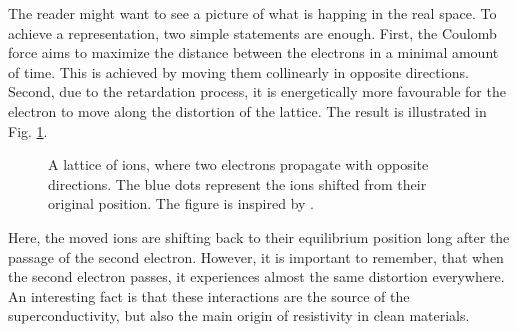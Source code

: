 \documentclass[../main.tex]{subfile}
\begin{document}
The reader might want to see a picture of what is happing in the real space. To achieve a representation, two simple statements are enough. 
First, the Coulomb force aims to maximize the distance between the electrons in a minimal amount of time.
 This is achieved by moving them collinearly in opposite directions. Second, due to the retardation process, it is energetically more favourable
for the electron to move along the distortion of the lattice. The result is illustrated in Fig. \ref{fig:CooperPairing}. 
\begin{figure}[H]
    
    \centering
    \caption{A lattice of ions, where two electrons propagate with opposite directions. The blue dots represent the ions shifted from their original position.
    The figure is inspired by \cite{FossheimSudbo2004}.} \label{fig:CooperPairing}
\end{figure}
Here, the moved ions are shifting back to their equilibrium position long after the passage of the second electron.
However, it is important to remember, that when the second electron passes, it experiences almost the same distortion everywhere.
An interesting fact is that these interactions are the source of the superconductivity, but also the main origin of resistivity in clean materials.
    
\end{document}
